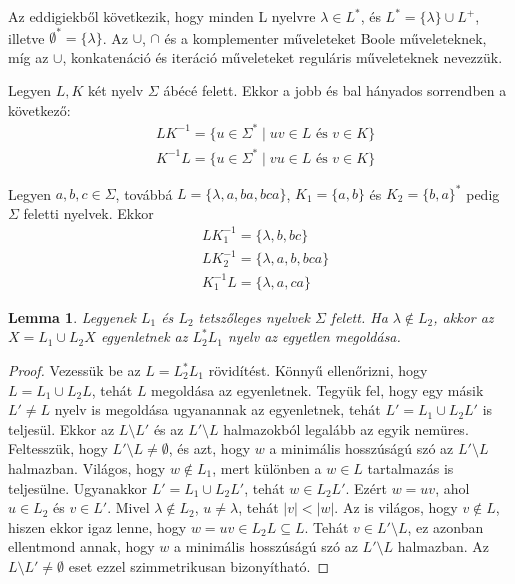 \documentclass[12pt]{report}
\newtheorem{lemma}[tét]{Lemma}
\theoremstyle{definition}
\begin{document}
\noindent Az eddigiekből következik, hogy minden L nyelvre $\lambda\in L^*$, és $L^* = \{\lambda\}\cup L^+$, illetve $\emptyset^* = \{\lambda\}$. Az $\cup$, $\cap$ és a komplementer műveleteket Boole műveleteknek, míg az $\cup$, konkatenáció és iteráció műveleteket reguláris műveleteknek nevezzük.

Legyen $L,K$ két nyelv $\Sigma$ ábécé felett. Ekkor a jobb és bal hányados sorrendben a következő:
\begin{equation*}
\begin{split}
&LK^{-1}=\{u\in\Sigma^*\mid uv\in L \text{ és } v\in K\}\\&
K^{-1}L=\{u\in\Sigma^*\mid vu\in L \text{ és } v\in K\}
\end{split}
\end{equation*}

\noindent Legyen $a,b,c\in\Sigma$, továbbá $L=\{\lambda,a,ba,bca\}$, $K_1=\{a,b\}$ és $K_2=\{b,a\}^*$ pedig $\Sigma$ feletti nyelvek. Ekkor
\begin{equation*}
\begin{split}
&LK^{-1}_1=\{\lambda,b,bc\}\\&
LK^{-1}_2=\{\lambda,a,b,bca\}\\&
K^{-1}_1 L=\{\lambda,a,ca\}
\end{split}
\end{equation*}

\begin{lemma}\label{egyenlet-lemma}
Legyenek $L_1$ és $L_2$ tetszőleges nyelvek $\Sigma$ felett. Ha $\lambda\notin L_2$, akkor az $X=L_1\cup L_2X$ egyenletnek az $L_2^*L_1$ nyelv az egyetlen megoldása.
\end{lemma}

\begin{proof} Vezessük be az $L=L_2^*L_1$ rövidítést. Könnyű ellenőrizni, hogy $L=L_1\cup L_2L$, tehát $L$ megoldása az egyenletnek.
Tegyük fel, hogy egy másik $L'\neq L$ nyelv is megoldása ugyanannak az egyenletnek, tehát $L'=L_1\cup L_2L'$ is teljesül. Ekkor az $L\setminus L'$ és az $L'\setminus L$ halmazokból legalább az egyik nemüres. Feltesszük, hogy $L'\setminus L\neq \emptyset$, és azt, hogy $w$ a minimális hosszúságú szó az $L'\setminus L$ halmazban. Világos, hogy $w\notin L_1$, mert különben a $w\in L$ tartalmazás is teljesülne. Ugyanakkor $L'=L_1\cup L_2L'$, tehát $w\in L_2L'$. Ezért $w=uv$, ahol $u\in L_2$ és $v\in L'$. Mivel $\lambda\notin L_2$, $u\neq\lambda$, tehát $|v|<|w|$. Az is világos, hogy $v\notin L$, hiszen ekkor igaz lenne, hogy $w=uv\in L_2L\subseteq L$. Tehát $v\in L'\setminus L$, ez azonban ellentmond annak, hogy $w$ a minimális hosszúságú szó az $L'\setminus L$ halmazban. Az $L\setminus L'\neq\emptyset$ eset ezzel szimmetrikusan bizonyítható.
\end{proof}
\end{document}
